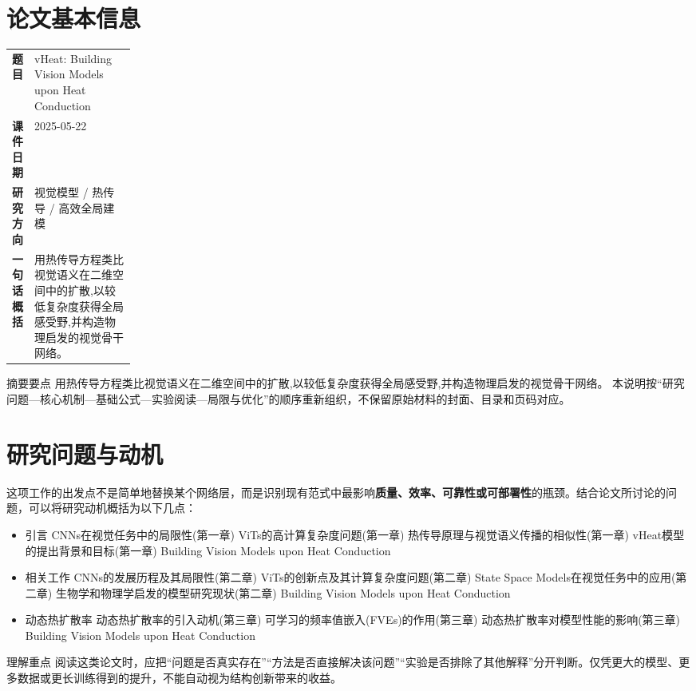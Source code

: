 \documentclass[UTF8,11pt,a4paper]{ctexart}
\newcommand{\term}[1]{\textbf{\textcolor{mainblue}{#1}}}
\begin{document}
\section{论文基本信息}
\begin{center}
\begin{tabularx}{0.94\linewidth}{>{\bfseries}p{0.18\linewidth}X}
\toprule
题目 & vHeat: Building Vision Models upon Heat Conduction\\
课件日期 & 2025-05-22\\
研究方向 & 视觉模型 / 热传导 / 高效全局建模\\
一句话概括 & 用热传导方程类比视觉语义在二维空间中的扩散,以较低复杂度获得全局感受野,并构造物理启发的视觉骨干网络。\\
\bottomrule
\end{tabularx}
\end{center}

\begin{infobox}{摘要要点}
用热传导方程类比视觉语义在二维空间中的扩散,以较低复杂度获得全局感受野,并构造物理启发的视觉骨干网络。 本说明按“研究问题—核心机制—基础公式—实验阅读—局限与优化”的顺序重新组织，不保留原始材料的封面、目录和页码对应。
\end{infobox}

\section{研究问题与动机}
这项工作的出发点不是简单地替换某个网络层，而是识别现有范式中最影响\term{质量、效率、可靠性或可部署性}的瓶颈。结合论文所讨论的问题，可以将研究动机概括为以下几点：
\begin{itemize}
\item 引言 CNNs在视觉任务中的局限性(第一章) ViTs的高计算复杂度问题(第一章) 热传导原理与视觉语义传播的相似性(第一章) vHeat模型的提出背景和目标(第一章) Building Vision Models upon Heat Conduction
\item 相关工作 CNNs的发展历程及其局限性(第二章) ViTs的创新点及其计算复杂度问题(第二章) State Space Models在视觉任务中的应用(第二章) 生物学和物理学启发的模型研究现状(第二章) Building Vision Models upon Heat Conduction
\item 动态热扩散率 动态热扩散率的引入动机(第三章) 可学习的频率值嵌入(FVEs)的作用(第三章) 动态热扩散率对模型性能的影响(第三章) Building Vision Models upon Heat Conduction
\end{itemize}

\begin{notebox}{理解重点}
阅读这类论文时，应把“问题是否真实存在”“方法是否直接解决该问题”“实验是否排除了其他解释”分开判断。仅凭更大的模型、更多数据或更长训练得到的提升，不能自动视为结构创新带来的收益。
\end{notebox}
\end{document}
